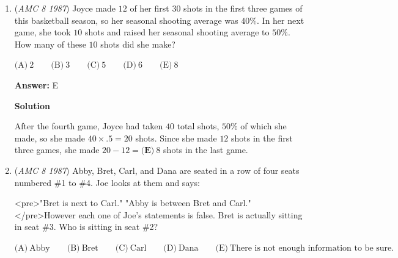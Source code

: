 \begin{enumerate}
 $\text{(A)}\ \$59.25 \qquad \text{(B)}\ \$60 \qquad \text{(C)}\ \$70 \qquad \text{(D)}\ \$79 \qquad \text{(E)}\ \$80$

 \textbf{Answer: }D



\textbf{Solution 1}

Let $x$ be the regular price of a tire.  Then $3x + \$3 = \$240$, so $x = \boxed{\textbf{(D)}\ \$79}$.

 



\textbf{Solution 2}

Since Sam paid $\$240$ for all $4$ tires, which included $\$3$ for the last one, he paid $\$240 - \$3 = \$237$ for the first $3$ tires at regular price.  Therefore, the regular price of a tire is $\$237 \div 3 = \boxed {\textbf {(D) } \$79}$.

 


	\item (\textit{AMC 8 1987}) Joyce made $12$ of her first $30$ shots in the first three games of this basketball season, so her seasonal shooting average was $40\%$.  In her next game, she took $10$ shots and raised her seasonal shooting average to $50\%$.  How many of these $10$ shots did she make?


 $\text{(A)}\ 2 \qquad \text{(B)}\ 3 \qquad \text{(C)}\ 5 \qquad \text{(D)}\ 6 \qquad \text{(E)}\ 8$

 \textbf{Answer: }E



\textbf{Solution}

After the fourth game, Joyce had taken $40$ total shots, $50\%$ of which she made, so she made $40\times .5=20$ shots.  Since she made $12$ shots in the first three games, she made $20-12=\boxed{\textbf{(E)}\ 8}$ shots in the last game.

 


	\item (\textit{AMC 8 1987}) Abby, Bret, Carl, and Dana are seated in a row of four seats numbered \#1 to \#4.  Joe looks at them and says:


 <pre>"Bret is next to Carl."
"Abby is between Bret and Carl."
</pre>However each one of Joe's statements is false.  Bret is actually sitting in seat \#3.  Who is sitting in seat \#2?


 $\text{(A)}\ \text{Abby} \qquad \text{(B)}\ \text{Bret} \qquad \text{(C)}\ \text{Carl} \qquad \text{(D)}\ \text{Dana} \qquad \text{(E)}\ \text{There is not enough information to be sure.}$


\end{enumerate}
